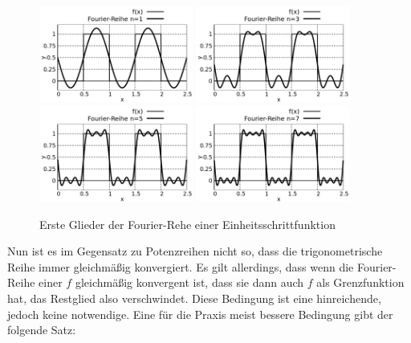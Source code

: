 \begin{figure}
    \centering
    \includegraphics[width=0.45\textwidth]{./gnuplot/fourier-transform-step-1}
    \includegraphics[width=0.45\textwidth]{./gnuplot/fourier-transform-step-2}
    \includegraphics[width=0.45\textwidth]{./gnuplot/fourier-transform-step-3}
    \includegraphics[width=0.45\textwidth]{./gnuplot/fourier-transform-step-4}
    \caption{Erste Glieder der Fourier-Rehe einer Einheitsschrittfunktion}
    \label{fig:ExUnitStepFourier}
\end{figure}

Nun ist es im Gegensatz zu Potenzreihen nicht so, dass die trigonometrische Reihe immer gleichmäßig konvergiert. Es gilt allerdings, dass wenn die Fourier-Reihe einer $f$ gleichmäßig konvergent ist, dass sie dann auch $f$ als Grenzfunktion hat, das Restglied also verschwindet. Diese Bedingung ist eine hinreichende, jedoch keine notwendige. Eine für die Praxis meist bessere Bedingung gibt der folgende Satz:

